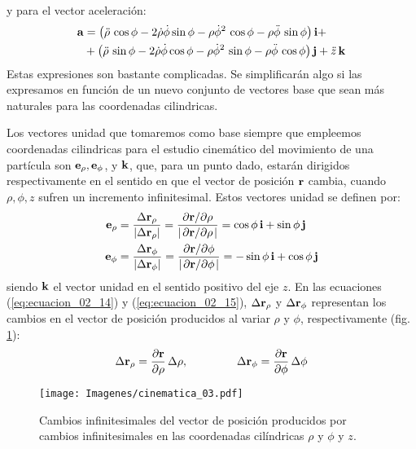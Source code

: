 \documentclass[12pt]{article}
\begin{document}
y para el vector aceleración:
\begin{align}
\begin{aligned}
\vb{a} &= \left( \ddot{\rho} \, \cos \phi - 2 \dot{\rho} \dot{\phi} \sin \phi - \rho \dot{\phi}^{2} \, \cos \phi - \rho \ddot{\phi} \, \sin \phi \right) \vb{i} + \\
&+ \left( \ddot{\rho} \, \sin \phi - 2 \dot{\rho} \dot{\phi} \cos \phi - \rho \dot{\phi}^{2} \, \sin \phi - \rho \ddot{\phi} \, \cos \phi \right) \vb{j} + \ddot{z} \, \vb{k}
\end{aligned}
\label{eq:ecuacion_02_13}
\end{align}
Estas expresiones son bastante complicadas. Se simplificarán algo si las expresamos en función de un nuevo conjunto de vectores base que sean más naturales para las coordenadas cilindricas. 
\par
Los vectores unidad que tomaremos como base siempre que empleemos coordenadas cilindricas para el estudio cinemático del movimiento de una partícula son $\vb{e}_{\rho}, \vb{e}_{\phi}$, y $\vb{k}$, que, para un punto dado, estarán dirigidos respectivamente en el sentido en que el vector de posición $\vb{r}$ cambia, cuando $\rho, \phi, z$ sufren un incremento infinitesimal. Estos vectores unidad se definen por:
\begin{align}
\vb{e}_{\rho} &= \dfrac{\Delta \vb{r}_{\rho}}{\abs{\Delta \vb{r}_{\rho}}} = \dfrac{\pdv*{\vb{r}}{\rho}}{\abs{\pdv*{\vb{r}}{\rho}}} = \cos \phi \, \vb{i} + \sin \phi \, \vb{j} \label{eq:ecuacion_02_14} \\
\vb{e}_{\phi} &= \dfrac{\Delta \vb{r}_{\phi}}{\abs{\Delta \vb{r}_{\phi}}} = \dfrac{\pdv*{\vb{r}}{\phi}}{\abs{\pdv*{\vb{r}}{\phi}}} = - \sin \phi \, \vb{i} + \cos \phi \, \vb{j} \label{eq:ecuacion_02_15}
\end{align}
siendo $\vb{k}$ el vector unidad en el sentido positivo del eje $z$. En las ecuaciones (\ref{eq:ecuacion_02_14}) y (\ref{eq:ecuacion_02_15}), $\Delta \vb{r}_{\rho}$ y $\Delta \vb{r}_{\phi}$ representan los cambios en el vector de posición producidos al variar $\rho$ y $\phi$, respectivamente (fig. \ref{fig:figura_02_03}):
\begin{align*}
\Delta \vb{r}_{\rho} = \pdv{\vb{r}}{\rho} \, \Delta \rho, \hspace{1.5cm} \Delta \vb{r}_{\phi} = \pdv{\vb{r}}{\phi} \, \Delta \phi
\end{align*}
\begin{figure}[H]
    \centering
    \texttt{[image: Imagenes/cinematica\_03.pdf]}
    \caption{Cambios infinitesimales del vector de posición producidos por cambios infinitesimales en las coordenadas cilíndricas $\rho$ y $\phi$ y $z$.}
    \label{fig:figura_02_03}
\end{figure}
\end{document}
